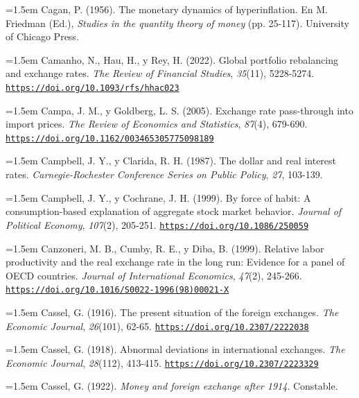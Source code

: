 \documentclass[10pt,a4paper]{article}
\begin{document}
\noindent\hangindent=1.5em Cagan, P. (1956). The monetary dynamics of hyperinflation. En M. Friedman (Ed.), \textit{Studies in the quantity theory of money} (pp. 25-117). University of Chicago Press.

\noindent\hangindent=1.5em Camanho, N., Hau, H., y Rey, H. (2022). Global portfolio rebalancing and exchange rates. \textit{The Review of Financial Studies}, \textit{35}(11), 5228-5274. \href{https://doi.org/10.1093/rfs/hhac023}{\nolinkurl{https://doi.org/10.1093/rfs/hhac023}}

\noindent\hangindent=1.5em Campa, J. M., y Goldberg, L. S. (2005). Exchange rate pass-through into import prices. \textit{The Review of Economics and Statistics}, \textit{87}(4), 679-690. \href{https://doi.org/10.1162/003465305775098189}{\nolinkurl{https://doi.org/10.1162/003465305775098189}}

\noindent\hangindent=1.5em Campbell, J. Y., y Clarida, R. H. (1987). The dollar and real interest rates. \textit{Carnegie-Rochester Conference Series on Public Policy}, \textit{27}, 103-139.

\noindent\hangindent=1.5em Campbell, J. Y., y Cochrane, J. H. (1999). By force of habit: A consumption-based explanation of aggregate stock market behavior. \textit{Journal of Political Economy}, \textit{107}(2), 205-251. \href{https://doi.org/10.1086/250059}{\nolinkurl{https://doi.org/10.1086/250059}}

\noindent\hangindent=1.5em Canzoneri, M. B., Cumby, R. E., y Diba, B. (1999). Relative labor productivity and the real exchange rate in the long run: Evidence for a panel of OECD countries. \textit{Journal of International Economics}, \textit{47}(2), 245-266. \href{https://doi.org/10.1016/S0022-1996(98)00021-X}{\nolinkurl{https://doi.org/10.1016/S0022-1996(98)00021-X}}

\noindent\hangindent=1.5em Cassel, G. (1916). The present situation of the foreign exchanges. \textit{The Economic Journal}, \textit{26}(101), 62-65. \href{https://doi.org/10.2307/2222038}{\nolinkurl{https://doi.org/10.2307/2222038}}

\noindent\hangindent=1.5em Cassel, G. (1918). Abnormal deviations in international exchanges. \textit{The Economic Journal}, \textit{28}(112), 413-415. \href{https://doi.org/10.2307/2223329}{\nolinkurl{https://doi.org/10.2307/2223329}}

\noindent\hangindent=1.5em Cassel, G. (1922). \textit{Money and foreign exchange after 1914}. Constable.
\end{document}
